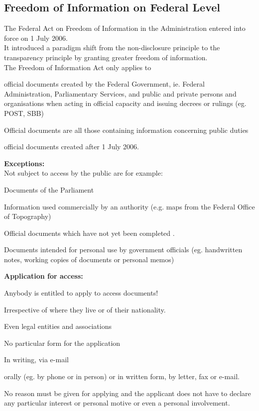 \subsection{Freedom of Information on Federal Level}
The Federal Act on Freedom of Information in the Administration entered into force on 1 July 2006.\\
It introduced a paradigm shift from the non-disclosure principle to the transparency principle by granting greater freedom of information.\\
The Freedom of Information Act only applies to
\begin{compactitem}
	\item official documents created by the Federal Government, ie. Federal Administration, Parliamentary Services, and public and private persons and organisations when acting in official capacity and issuing decrees or rulings (eg. POST, SBB)
	\item Official documents are all those containing information concerning public duties
	\item official documents created after 1 July 2006.
\end{compactitem}
\textbf{Exceptions:}\\
Not subject to access by the public are for example:
\begin{compactitem}
	\item Documents of the Parliament
	\item Information used commercially by an authority (e.g. maps from the Federal	Office of Topography)
	\item Official documents which have not yet been completed .
	\item Documents intended for personal use by government officials (eg. handwritten notes, working copies of documents or personal memos)
\end{compactitem}
\textbf{Application for access:}
\begin{compactitem}
	\item Anybody is entitled to apply to access documents!
	\begin{compactitem}
		\item Irrespective of where they live or of their nationality.
		\item Even legal entities and associations
	\end{compactitem}
	\item No particular form for the application
	\begin{compactitem}
		\item In writing, via e-mail
		\item orally (eg. by phone or in person) or in written form, by letter, fax or e-mail.
		\item No reason must be given for applying and the applicant does not have to declare any particular interest or personal motive or even a personal involvement.
	\end{compactitem}
\end{compactitem}
